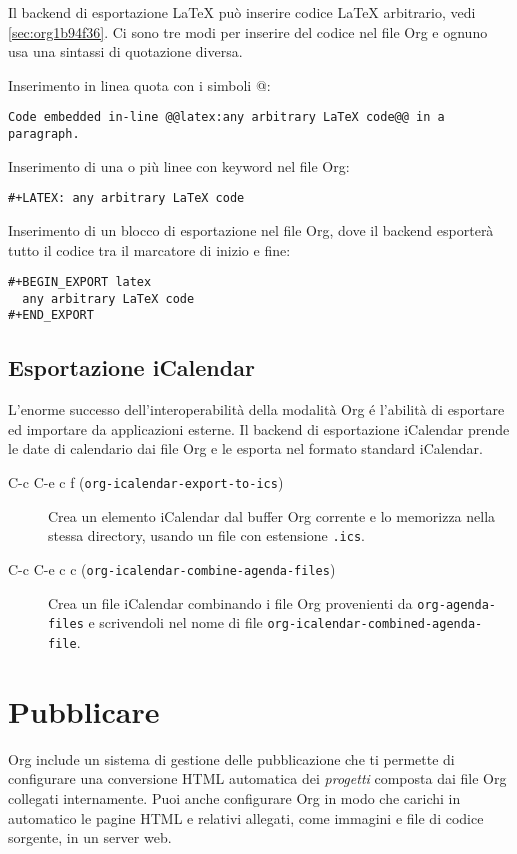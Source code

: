 \documentclass[11pt]{article}
\begin{document}
Il backend di esportazione \LaTeX{} può inserire codice \LaTeX{} arbitrario,
vedi \ref{sec:org1b94f36}. Ci sono tre modi per inserire del codice nel
file Org e ognuno usa una sintassi di quotazione diversa.

Inserimento in linea quota con i simboli @:

\begin{verbatim}
Code embedded in-line @@latex:any arbitrary LaTeX code@@ in a paragraph.
\end{verbatim}


Inserimento di una o più linee con keyword nel file Org:

\begin{verbatim}
#+LATEX: any arbitrary LaTeX code
\end{verbatim}


Inserimento di un blocco di esportazione nel file Org, dove il backend
esporterà tutto il codice tra il marcatore di inizio e fine:

\begin{verbatim}
#+BEGIN_EXPORT latex
  any arbitrary LaTeX code
#+END_EXPORT
\end{verbatim}

\subsection{Esportazione iCalendar}
\label{sec:org8c12399}
L'enorme successo dell'interoperabilità della modalità Org é l'abilità
di esportare ed importare da applicazioni esterne. Il backend di
esportazione iCalendar prende le date di calendario dai file Org e le
esporta nel formato standard iCalendar.

\begin{description}
\item[{C-c C-e c f (\texttt{org-icalendar-export-to-ics})}] Crea un elemento iCalendar dal buffer Org corrente e lo memorizza
nella stessa directory, usando un file con estensione \texttt{.ics}.

\item[{C-c C-e c c (\texttt{org-icalendar-combine-agenda-files}) }] Crea un file iCalendar combinando i file Org provenienti da
\texttt{org-agenda-files} e scrivendoli nel nome di file
\texttt{org-icalendar-combined-agenda-file}.
\end{description}

\section{Pubblicare}
\label{sec:orgc5f62ed}
Org include un sistema di gestione delle pubblicazione che ti permette
di configurare una conversione HTML automatica dei \emph{progetti} composta
dai file Org collegati internamente. Puoi anche configurare Org in
modo che carichi in automatico le pagine HTML e relativi allegati,
come immagini e file di codice sorgente, in un server web.
\end{document}

